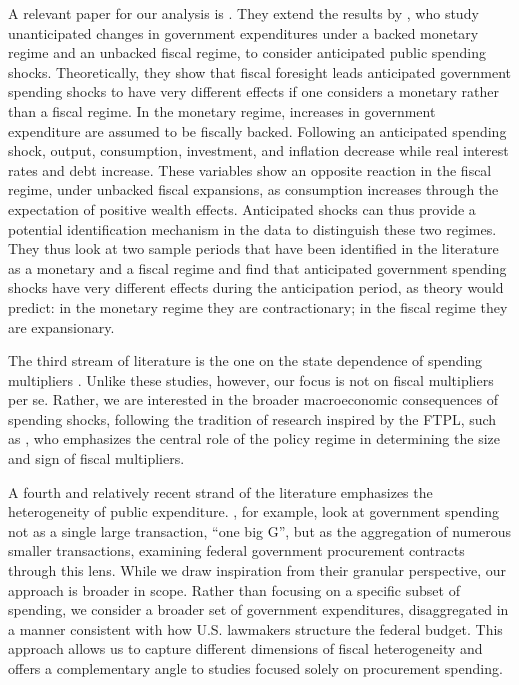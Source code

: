 \documentclass[12pt]{article}%
\theoremstyle{remark}
\begin{document}
A relevant paper for our analysis is \cite{ASCARI20231}. They extend the results by \citet{Beck}, who study unanticipated changes in government expenditures under a backed monetary regime and an unbacked fiscal regime, to consider anticipated public spending shocks. 
Theoretically, they show that fiscal foresight leads anticipated government spending shocks to have very different effects if one considers a monetary rather than a fiscal regime. In the monetary regime, increases in government expenditure are assumed to be fiscally backed. Following an anticipated spending shock, output, consumption, investment, and inflation decrease while real interest rates and debt increase. These variables show an opposite reaction in the fiscal regime, under unbacked fiscal expansions, as consumption increases through the expectation of positive wealth effects.
Anticipated shocks can thus provide a potential identification mechanism in the data to distinguish these two regimes. They thus look at two sample periods that have been identified in the literature as a monetary and a fiscal regime and find that anticipated government spending shocks have very different effects during the anticipation period, as theory would predict: in the monetary regime they are contractionary;
in the fiscal regime they are expansionary. 

The third stream of literature is the one on the state dependence of spending multipliers \citep[see][]{AuGoro2012, RameyZuba2018, Caggianoetal2015EJ}. Unlike these studies, however, our focus is not on fiscal multipliers per se. Rather, we are interested in the broader macroeconomic consequences of spending shocks, following the tradition of research inspired by the FTPL, such as \cite{LeeperTraumWalker:2017}, who emphasizes the central role of the policy regime in determining the size and sign of fiscal multipliers. 

A fourth and relatively recent strand of the literature emphasizes the heterogeneity of public expenditure. \cite{coxetal_24}, for example, look at government spending not as a single large transaction, “one big G”, but as the aggregation of numerous smaller transactions, examining federal government procurement contracts through this lens. While we draw inspiration from their granular perspective, our approach is broader in scope. Rather than focusing on a specific subset of spending, we consider a broader set of government expenditures, disaggregated in a manner consistent with how U.S. lawmakers structure the federal budget. This approach allows us to capture different dimensions of fiscal heterogeneity and offers a complementary angle to studies focused solely on procurement spending.
\end{document}
